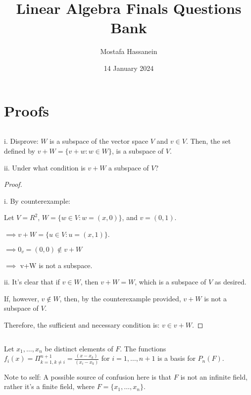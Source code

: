\documentclass{article}
\author{Mostafa Hassanein}
\title{Linear Algebra Finals Questions Bank}
\date{14 January 2024}
\newenvironment{customthm}[1]
  {\renewcommand\theinnercustomthm{#1}\innercustomthm}
  {\endinnercustomthm}
\begin{document}
\maketitle

\newpage

\section*{Proofs}

\begin{customthm}{1}[2023.S(1.A.i)]
  $ $

  i. Disprove: $W$ is a subspace of the vector space $V$ and $v \in V$. Then, the set defined by $v+W = \{ v+w: w \in W \}$, is a subspace of $V$.
  \newline

  ii. Under what condition is $v+W$ a subspace of $V$?
\end{customthm}

\begin{proof}
  $ $

  i. By counterexample: 
  
  Let $V = R^2$, $W = \{ w \in V: w = (x,0) \}$, and $v = (0, 1)$.
  
  \noindent
  $\implies v+W = \{ u \in V: u = (x, 1) \}$.

  \noindent
  $\implies 0_v = (0, 0) \notin v+W$

  \noindent
  $\implies$ v+W is not a subspace.
  \newline

  ii. It's clear that if $v \in W$, then $v+W = W$, which is a subspace of $V$ as desired.

  If, however, $v \notin W$, then, by the counterexample provided, $v+W$ is not a subspace of $V$.

  Therefore, the sufficient and necessary condition is: $v \in v+W$.

\end{proof}
\newpage

\begin{customthm}{2}[2023.S(1.A.ii)]
  $ $

  Let $x_1,\ldots,x_n$ be distinct elements of $F$. The functions $f_i(x)= \Pi_{k=1,k \neq i}^{n+1} = \frac{(x-x_k)}{(x_i-x_k)}$ for $i=1,\ldots,n+1$ is a basis for $P_n(F)$.
  \newline

  Note to self: A possible source of confusion here is that $F$ is not an infinite field, rather it's a finite field, where $F = \{x_1,\ldots,x_n \}$.
\end{customthm}
\end{document}
